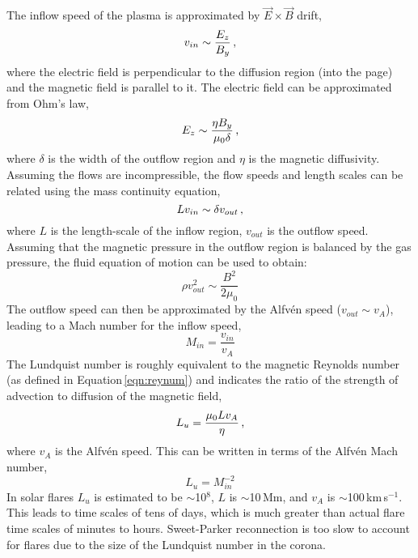 The inflow speed of the plasma is approximated by $\vec{E}\times\vec{B}$ drift, 
\begin{equation}
v_{in} \sim \frac{E_{z}}{B_{y}} \mbox{\,,}
\end{equation}
where the electric field is perpendicular to the diffusion region (into the page) and the magnetic field is parallel to it. The electric field can be approximated from Ohm's law,
\begin{equation}
E_z \sim \frac{\eta B_y}{\mu_0 \delta} \mbox{\,,} 
\end{equation}
where $\delta$ is the width of the outflow region and $\eta$ is the magnetic diffusivity. Assuming the flows are incompressible, the flow speeds and length scales can be related using the mass continuity equation,
\begin{equation}
L v_{in} \sim \delta v_{out} \mbox{\,,}
\end{equation}
where $L$ is the length-scale of the inflow region, $v_{out}$ is the outflow speed. Assuming that the magnetic pressure in the outflow region is balanced by the gas pressure, the fluid equation of motion can be used to obtain:
\begin{equation}
\rho v_{out}^2 \sim \frac{B^2}{2 \mu_0}  
\end{equation}
The outflow speed can then be approximated by the Alfv\'en speed ($v_{out} \sim v_A$), leading to a Mach number for the inflow speed,
\begin{equation}
M_{in}=\frac{v_{in}}{v_A}  
\end{equation}
The Lundquist number is roughly equivalent to the magnetic Reynolds number (as defined in Equation\,\ref{eqn:reynum}) and indicates the ratio of the strength of advection to diffusion of the magnetic field,
\begin{equation}
L_u = \frac{\mu_0 L v_A}{\eta} \mbox{\,,}
\end{equation}
where $v_A$ is the Alfv\'en speed. This can be written in terms of the Alfv\'en Mach number,
\begin{equation}
L_u = M_{in}^{-2}  
\end{equation}
In solar flares $L_u$ is estimated to be $\sim$10$^8$, $L$ is $\sim$10\,Mm, and $v_A$ is $\sim$100\,km\,s$^{-1}$. This leads to time scales of tens of days, which is much greater than actual flare time scales of minutes to hours. Sweet-Parker reconnection is too slow to account for flares due to the size of the Lundquist number in the corona. 

